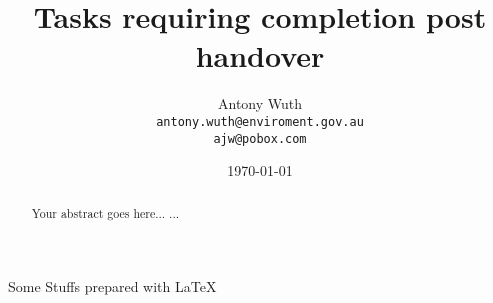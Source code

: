 \documentclass[11pt,a4paper,oneside]{report}
\begin{document}
\title{Tasks requiring completion post handover}
\author{Antony Wuth \\
\texttt{antony.wuth@enviroment.gov.au} \\
\texttt{ajw@pobox.com}}
\date{\today}
\maketitle
\begin{abstract}
Your abstract goes here...
...
\end{abstract}
Some Stuffs
prepared with \LaTeX{}
\end{document}
